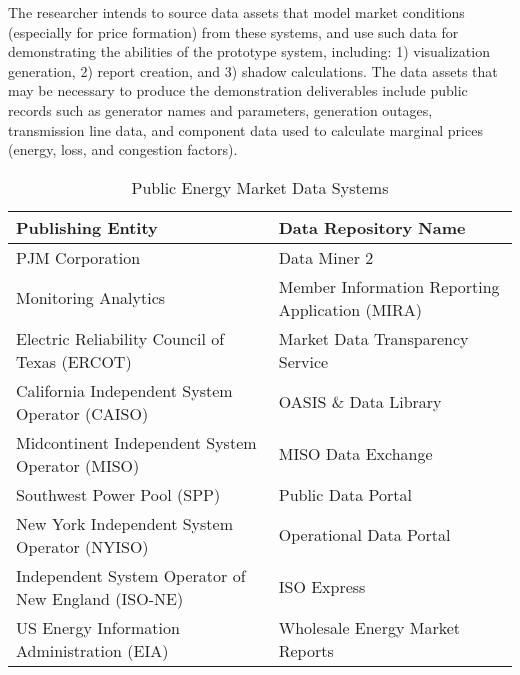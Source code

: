 The researcher intends to source data assets that model market conditions (especially for price formation) from these systems, and use such data for demonstrating the abilities of the prototype system, including: 1) visualization generation, 2) report creation, and 3) shadow calculations. The data assets that may be necessary to produce the demonstration deliverables include public records such as generator names and parameters, generation outages, transmission line data, and component data used to calculate marginal prices (energy, loss, and congestion factors). 

\begin{table}[H]
    \centering
        \begin{tabular}{|p{6cm}|p{6cm}|}
        \hline
        \textbf{Publishing Entity} & \textbf{Data Repository Name} \\
        \hline
        PJM Corporation & Data Miner 2 \\
        \hline
        Monitoring Analytics & Member Information Reporting \newline Application (MIRA) \\
        \hline
        Electric Reliability Council \newline of Texas (ERCOT) & Market Data Transparency Service \\
        \hline
        California Independent System \newline Operator (CAISO) & OASIS \& Data Library \\
        \hline
        Midcontinent Independent System \newline Operator (MISO) & MISO Data Exchange \\
        \hline
        Southwest Power Pool (SPP) & Public Data Portal \\
        \hline
        New York Independent System \newline Operator (NYISO) & Operational Data Portal \\
        \hline
        Independent System Operator of \newline New England (ISO-NE) & ISO Express \\
        \hline
        US Energy Information \newline Administration (EIA) & Wholesale Energy Market Reports \\
        \hline
        \end{tabular}
    \caption{Public Energy Market Data Systems}
    \label{tab:public-data-repos}
\end{table}

